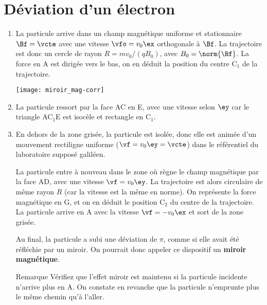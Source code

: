 \documentclass[a4paper, 12pt, final, garamond]{book}
\begin{document}
\section{Déviation d'un électron}
\begin{enumerate}

    \item La particule arrive dans un champ magnétique uniforme et stationnaire
        ${\Bf=\vcte}$ avec une vitesse $\vfo=v_0\ex$ orthogonale à $\Bf$. La
        trajectoire est donc un cercle de rayon $R=mv_0/(qB_0)$, avec
        $B_0=\norm{\Bf}$. La force en A est dirigée vers le bas, on en déduit la
        position du centre C$_1$ de la trajectoire.

        \begin{center}
            \texttt{[image: miroir\_mag-corr]}
            \label{fig:miroir_mag_corr}
        \end{center}

    \item La particule ressort par la face AC en E, avec une vitesse selon
        $\ey$ car le triangle AC$_1$E est isocèle et rectangle en C$_1$. 

    \item En dehors de la zone grisée, la particule est isolée, donc elle est
        animée d'un mouvement rectiligne uniforme ($\vf=v_0\ey=\vcte$) dans le
        référentiel du laboratoire supposé galiléen. \bigbreak

        La particule entre à nouveau dans le zone où règne le champ magnétique
        par la face AD, avec une vitesse $\vf=v_0\ey$. La trajectoire est
        alors circulaire de même rayon $R$ (car la vitesse est la même en
        norme). On représente la force magnétique en G, et on en déduit le
        position C$_2$ du centre de la trajectoire. La particule arrive en A
        avec la vitesse $\vf=-v_0\ex$ et sort de la zone grisée. \bigbreak
	
        Au final, la particule a subi une déviation de $\pi$, comme si elle
        avait été réfléchie par un miroir. On pourrait donc appeler ce
        dispositif un \textbf{miroir magnétique}.
	
        \begin{rexem}{Remarque}
            Vérifiez que l'effet miroir est maintenu si la particule incidente
            n'arrive plus en A. On constate en revanche que la particule
            n'emprunte plus le même chemin qu'à l'aller. 
        \end{rexem}
\end{enumerate}
\end{document}
